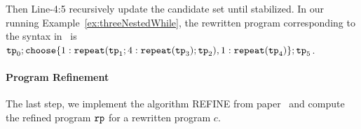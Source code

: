 Then Line-4:5 recursively update the candidate set until stabilized.
In our running Example~\ref{ex:threeNestedWhile}, the rewritten program corresponding to the syntax in~\cite{GulwaniJK09} is
$ \tpath_0 ; \rpchoose{ 1: \rprepeat(\tpath_1; 4:\rprepeat(\tpath_3); \tpath_2), 
1: \rprepeat(\tpath_4) }; \tpath_5$.

\paragraph{Program Refinement}
The last step, we implement the algorithm REFINE from paper~\cite{GulwaniJK09} and compute the 
refined program $\mathtt{rp}$ for a rewritten program $c$.


